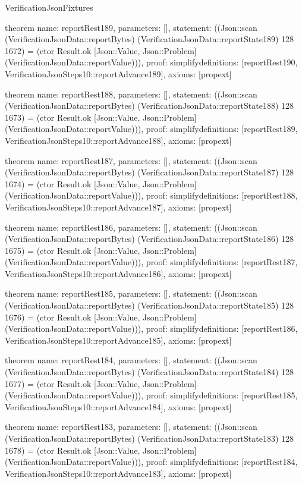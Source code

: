 \begin{lexlean}{VerificationJsonFixtures}
\begin{semanticmodule}
theorem{
  name: reportRest189,
  parameters: [],
  statement: ((Json::scan (VerificationJsonData::reportBytes) (VerificationJsonData::reportState189) 128 1672) = (ctor Result.ok [Json::Value, Json::Problem] (VerificationJsonData::reportValue))),
  proof: simplify{definitions: [reportRest190, VerificationJsonSteps10::reportAdvance189]},
  axioms: [propext]
}

theorem{
  name: reportRest188,
  parameters: [],
  statement: ((Json::scan (VerificationJsonData::reportBytes) (VerificationJsonData::reportState188) 128 1673) = (ctor Result.ok [Json::Value, Json::Problem] (VerificationJsonData::reportValue))),
  proof: simplify{definitions: [reportRest189, VerificationJsonSteps10::reportAdvance188]},
  axioms: [propext]
}

theorem{
  name: reportRest187,
  parameters: [],
  statement: ((Json::scan (VerificationJsonData::reportBytes) (VerificationJsonData::reportState187) 128 1674) = (ctor Result.ok [Json::Value, Json::Problem] (VerificationJsonData::reportValue))),
  proof: simplify{definitions: [reportRest188, VerificationJsonSteps10::reportAdvance187]},
  axioms: [propext]
}

theorem{
  name: reportRest186,
  parameters: [],
  statement: ((Json::scan (VerificationJsonData::reportBytes) (VerificationJsonData::reportState186) 128 1675) = (ctor Result.ok [Json::Value, Json::Problem] (VerificationJsonData::reportValue))),
  proof: simplify{definitions: [reportRest187, VerificationJsonSteps10::reportAdvance186]},
  axioms: [propext]
}

theorem{
  name: reportRest185,
  parameters: [],
  statement: ((Json::scan (VerificationJsonData::reportBytes) (VerificationJsonData::reportState185) 128 1676) = (ctor Result.ok [Json::Value, Json::Problem] (VerificationJsonData::reportValue))),
  proof: simplify{definitions: [reportRest186, VerificationJsonSteps10::reportAdvance185]},
  axioms: [propext]
}

theorem{
  name: reportRest184,
  parameters: [],
  statement: ((Json::scan (VerificationJsonData::reportBytes) (VerificationJsonData::reportState184) 128 1677) = (ctor Result.ok [Json::Value, Json::Problem] (VerificationJsonData::reportValue))),
  proof: simplify{definitions: [reportRest185, VerificationJsonSteps10::reportAdvance184]},
  axioms: [propext]
}

theorem{
  name: reportRest183,
  parameters: [],
  statement: ((Json::scan (VerificationJsonData::reportBytes) (VerificationJsonData::reportState183) 128 1678) = (ctor Result.ok [Json::Value, Json::Problem] (VerificationJsonData::reportValue))),
  proof: simplify{definitions: [reportRest184, VerificationJsonSteps10::reportAdvance183]},
  axioms: [propext]
}


\end{semanticmodule}
\end{lexlean}
